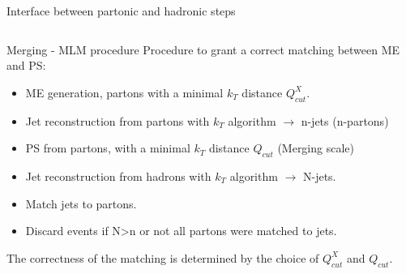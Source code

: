 \begin{frame}{Interface between partonic and hadronic steps}
\vspace{-.2cm}

\begin{columns}
\begin{column}{.50\textwidth}
  \vspace{-.2cm}
  \begin{block}{Merging - MLM procedure}\scriptsize
    Procedure to grant a correct matching between ME and PS:
    \begin{itemize}
    \item ME generation, partons with a minimal $k_{T}$ distance $Q^{X}_{cut}$.
    \item Jet reconstruction from partons with $k_{T}$ algorithm $\to$ n-jets (n-partons)
    \item PS from partons, with a minimal $k_{T}$ distance $Q_{cut}$ (Merging scale)
    \item Jet reconstruction from hadrons with $k_{T}$ algorithm $\to$ N-jets.
    \item Match jets to partons.
    \item Discard events if N>n or not all partons were matched to jets. 
    \end{itemize}
    The correctness of the matching is determined by the choice of $Q^{X}_{cut}$ and $Q_{cut}$.
  \end{block}
\end{column}


\end{columns}
\end{frame}

